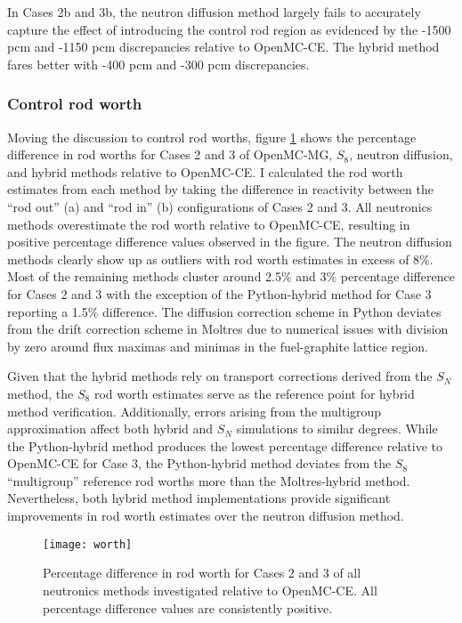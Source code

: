 In Cases 2b and 3b, the neutron diffusion method largely fails to accurately capture the
effect of introducing the control rod region as evidenced by the -1500 pcm and -1150 pcm
discrepancies relative to OpenMC-CE. The hybrid method fares better with -400 pcm and -300 pcm
discrepancies.

\subsubsection{Control rod worth}

Moving the discussion to control rod worths, figure \ref{fig:1d-worth} shows the percentage
difference in rod worths for Cases 2 and 3 of OpenMC-MG, $S_8$, neutron diffusion, and hybrid
methods relative to OpenMC-CE. I calculated the rod worth estimates from each method by taking the
difference in reactivity between the ``rod out'' (a) and ``rod in'' (b) configurations of Cases 2
and 3. All neutronics methods overestimate the rod worth relative to OpenMC-CE, resulting in
positive percentage difference values observed in the figure.
The neutron diffusion methods clearly show up as outliers with rod worth estimates in excess
of 8\%. Most of the remaining methods cluster around 2.5\% and 3\% percentage difference for Cases
2 and 3 with the exception of the Python-hybrid method for Case 3 reporting a 1.5\% difference.
The diffusion correction scheme in Python deviates from the drift correction
scheme in Moltres due to numerical issues with division by zero around flux maximas and minimas
in the fuel-graphite lattice region.

Given that the hybrid methods rely on transport corrections derived from the $S_N$ method, the
$S_8$ rod worth estimates serve as the
reference point for hybrid method verification. Additionally, errors arising from the multigroup
approximation affect both hybrid and $S_N$ simulations to similar degrees. While the Python-hybrid
method produces the lowest percentage difference relative to OpenMC-CE for Case 3, the
Python-hybrid method deviates from the $S_8$ ``multigroup'' reference rod worths more than the
Moltres-hybrid method. Nevertheless, both hybrid method implementations provide significant
improvements in rod worth estimates over the neutron diffusion method.

\begin{figure}[h]
  \centering
  \texttt{[image: worth]}
  \caption{Percentage difference in rod worth for Cases 2 and 3 of all neutronics methods
  investigated relative to OpenMC-CE. All percentage difference values are consistently positive.}
  \label{fig:1d-worth}
\end{figure}

